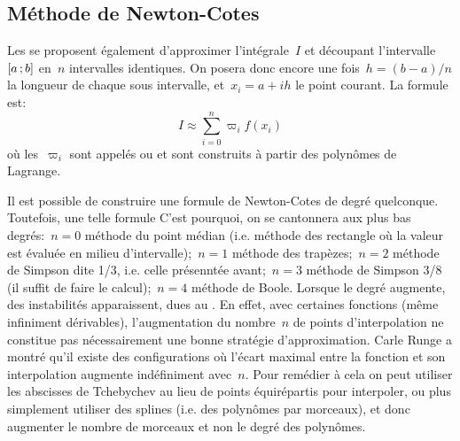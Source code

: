 \subsection*{Méthode de Newton-Cotes} 
Les  se proposent également d'approximer l'intégrale~$I$ et découpant l'intervalle~$\mathopen{[}a\,;b\mathclose{]}$ en~$n$ intervalles identiques. On posera donc encore une fois~$h=(b-a)/n$ la longueur de chaque sous intervalle, et~$x_i=a+ih$ le point courant. La formule est: 
\begin{equation}
 I\approx \sum_{i=0}^n \varpi_i f(x_i) 
\end{equation}
où les~$\varpi_i$ sont appelés  ou  et sont construits à partir des polynômes de Lagrange.  

\begin{remarque} Il est possible de construire une formule de Newton-Cotes de degré quelconque. Toutefois, une telle formule  C'est pourquoi, on se cantonnera aux plus bas degrés:~$n=0$ méthode du point médian (i.e. méthode des rectangle où la valeur est évaluée en milieu d'intervalle);~$n=1$ méthode des trapèzes;~$n=2$ méthode de Simpson dite 1/3, i.e. celle présenntée avant;~$n=3$ méthode de Simpson 3/8 (il suffit de faire le calcul);~$n=4$ méthode de Boole. Lorsque le degré augmente, des instabilités apparaissent, dues au . En effet, avec certaines fonctions (même infiniment dérivables), l'augmentation du nombre~$n$ de points d'interpolation ne constitue pas nécessairement une bonne stratégie d'approximation. Carle Runge a montré qu'il existe des configurations où l'écart maximal entre la fonction et son interpolation augmente indéfiniment avec~$n$. Pour remédier à cela on peut utiliser les abscisses de Tchebychev au lieu de points équirépartis pour interpoler, ou plus simplement utiliser des splines (i.e. des polynômes par morceaux), et donc augmenter le nombre de morceaux et non le degré des polynômes. 
\end{remarque} 
